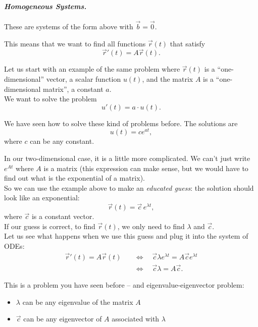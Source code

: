 \paragraph{\emph{Homogeneous Systems.}} These are systems of the form above with $\vec{b} = \vec{0}$.

This means that we want to find all functions $\vec{r}(t)$ that satisfy
$$
\vec{r}'(t) = A \vec{r}(t).
$$


\begin{example}
Let us start with an example of the same problem where $\vec{r}(t)$ is a ``one-dimensional'' vector, a scalar function $u(t)$, and the matrix $A$ is a ``one-dimensional matrix'', a constant $a$. \\

We want to solve the problem	
$$
u'(t) = a \cdot u(t).
$$

We have seen how to solve these kind of problems before. The solutions are
$$
u(t) = c e^{at},
$$
where $c$ can be any constant.
\end{example}

In our two-dimensional case, it is a little more complicated. We can't just write $e^{At}$ where $A$ is a matrix (this expression can make sense, but we would have to find out what is the exponential of a matrix). \\

So we can use the example above to make an \emph{educated guess}: the solution should look like an exponential:
$$
\vec{r}(t) = 
\vec{c} \, e^{\lambda t},
$$
where $\vec{c}$ is a constant vector. \\

If our guess is correct, to find $\vec{r}(t)$, we only need to find $\lambda$ and $\vec{c}$. \\

Let us see what happens when we use this guess and plug it into the system of ODEs:
\begin{align*}
\vec{r}'(t) = A \vec{r}(t) \quad
	& \Leftrightarrow \quad \vec{c} \lambda e^{\lambda t} = A \vec{c} e^{\lambda t} \\
	& \Leftrightarrow \quad \vec{c} \lambda = A \vec{c}.
\end{align*}

This is a problem you have seen before -- and eigenvalue-eigenvector problem: 
\begin{itemize}
	\item $\lambda$ can be any eigenvalue of the matrix $A$
	\item $\vec{c}$ can be any eigenvector of $A$ associated with $\lambda$ 
\end{itemize}

